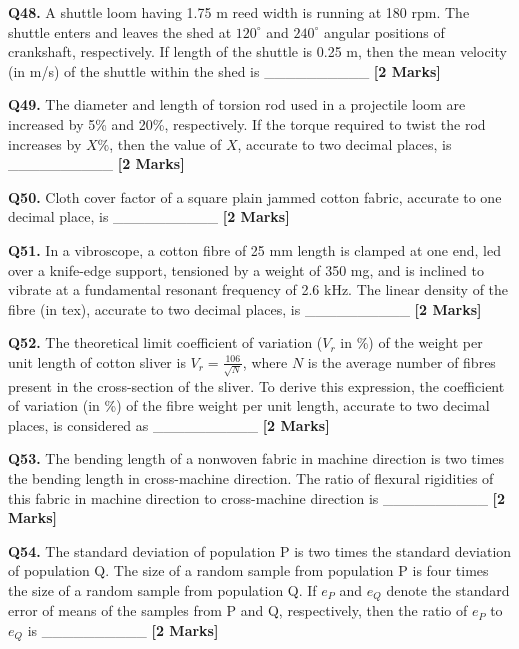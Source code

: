 \documentclass[11pt]{article}
\newcommand{\questionb}[2]{
    \noindent\textbf{Q#2.} #1 \hfill \textbf{[2 Marks]}
}
\begin{document}
\questionb{A shuttle loom having 1.75 m reed width is running at 180 rpm. The shuttle enters and leaves the shed at \(120^\circ\) and \(240^\circ\) angular positions of crankshaft, respectively. If length of the shuttle is 0.25 m, then the mean velocity (in m/s) of the shuttle within the shed is \_\_\_\_\_\_\_\_\_\_}{48}
\vspace{0.5cm}

\questionb{The diameter and length of torsion rod used in a projectile loom are increased by 5\% and 20\%, respectively. If the torque required to twist the rod increases by \(X\%\), then the value of \(X\), accurate to two decimal places, is \_\_\_\_\_\_\_\_\_\_}{49}
\vspace{0.5cm}

\questionb{Cloth cover factor of a square plain jammed cotton fabric, accurate to one decimal place, is \_\_\_\_\_\_\_\_\_\_}{50}
\vspace{0.5cm}

\questionb{In a vibroscope, a cotton fibre of 25 mm length is clamped at one end, led over a knife-edge support, tensioned by a weight of 350 mg, and is inclined to vibrate at a fundamental resonant frequency of 2.6 kHz. The linear density of the fibre (in tex), accurate to two decimal places, is \_\_\_\_\_\_\_\_\_\_}{51}
\vspace{0.5cm}

\questionb{The theoretical limit coefficient of variation (\(V_r\) in \%) of the weight per unit length of cotton sliver is \(V_r = \frac{106}{\sqrt{N}}\), where \(N\) is the average number of fibres present in the cross-section of the sliver. To derive this expression, the coefficient of variation (in \%) of the fibre weight per unit length, accurate to two decimal places, is considered as \_\_\_\_\_\_\_\_\_\_}{52}
\vspace{0.5cm}

\questionb{The bending length of a nonwoven fabric in machine direction is two times the bending length in cross-machine direction. The ratio of flexural rigidities of this fabric in machine direction to cross-machine direction is \_\_\_\_\_\_\_\_\_\_}{53}
\vspace{0.5cm}

\questionb{The standard deviation of population P is two times the standard deviation of population Q. The size of a random sample from population P is four times the size of a random sample from population Q. If \(e_P\) and \(e_Q\) denote the standard error of means of the samples from P and Q, respectively, then the ratio of \(e_P\) to \(e_Q\) is \_\_\_\_\_\_\_\_\_\_}{54}
\vspace{0.5cm}
\end{document}
